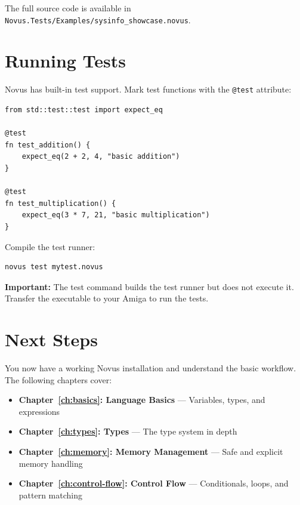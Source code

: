 The full source code is available in \texttt{Novus.Tests/Examples/sysinfo\_showcase.novus}.

\section{Running Tests}
\label{sec:running-tests}

Novus has built-in test support. Mark test functions with the \texttt{@test} attribute:

\begin{lstlisting}
from std::test::test import expect_eq

@test
fn test_addition() {
    expect_eq(2 + 2, 4, "basic addition")
}

@test
fn test_multiplication() {
    expect_eq(3 * 7, 21, "basic multiplication")
}
\end{lstlisting}

Compile the test runner:

\begin{lstlisting}[language=bash]
novus test mytest.novus
\end{lstlisting}

\textbf{Important:} The test command builds the test runner but does not execute it. Transfer the executable to your Amiga to run the tests.

\section{Next Steps}
\label{sec:next-steps}

You now have a working Novus installation and understand the basic workflow. The following chapters cover:

\begin{itemize}
    \item \textbf{Chapter~\ref{ch:basics}: Language Basics} --- Variables, types, and expressions
    \item \textbf{Chapter~\ref{ch:types}: Types} --- The type system in depth
    \item \textbf{Chapter~\ref{ch:memory}: Memory Management} --- Safe and explicit memory handling
    \item \textbf{Chapter~\ref{ch:control-flow}: Control Flow} --- Conditionals, loops, and pattern matching
\end{itemize}

